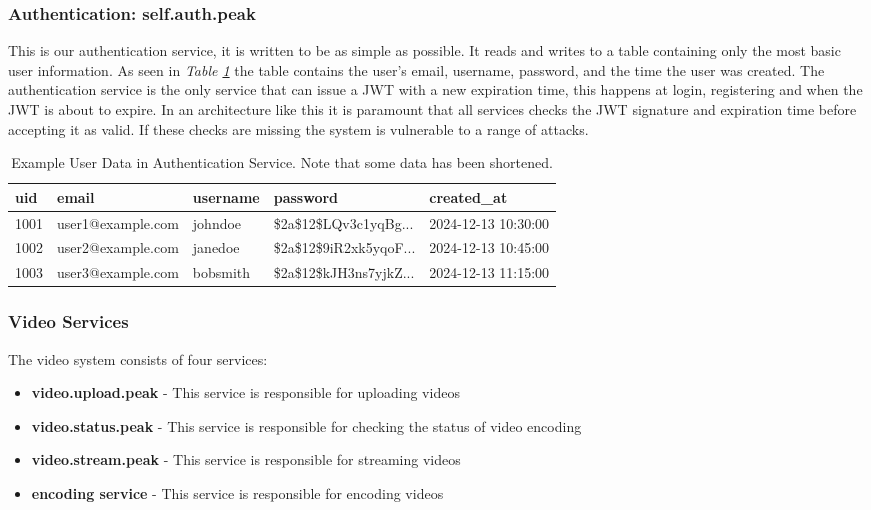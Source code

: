 \documentclass[12pt]{article}
\begin{document}
\subsubsection{Authentication: self.auth.peak}
This is our authentication service, it is written to be as simple as possible.
It reads and writes to a table containing only the most basic user information.
As seen in \textit{Table \ref{tab:user-data}} the table contains the user's email, 
username, password, and the time the user was created. The authentication service
is the only service that can issue a JWT with a new expiration time, this
happens at login, registering and when the JWT is about to expire.
In an architecture like this it is paramount that all services checks
the JWT signature and expiration time before accepting it as valid.
If these checks are missing the system is vulnerable to a range of attacks.

\begin{table}[h]
    \centering
    \caption{Example User Data in Authentication Service. Note that some data has been shortened.}
    \begin{tabular}{|l|l|l|p{4.5cm}|l|}
        \hline
        \textbf{uid} & \textbf{email} & \textbf{username} & \textbf{password} & \textbf{created\_at} \\
        \hline
        1001 & user1@example.com & johndoe & \$2a\$12\$LQv3c1yqBg... & 2024-12-13 10:30:00 \\
        \hline
        1002 & user2@example.com & janedoe & \$2a\$12\$9iR2xk5yqoF... & 2024-12-13 10:45:00 \\
        \hline
        1003 & user3@example.com & bobsmith & \$2a\$12\$kJH3ns7yjkZ... & 2024-12-13 11:15:00 \\
        \hline
    \end{tabular}
    \label{tab:user-data}
\end{table}

\newpage

\subsubsection{Video Services}
The video system consists of four services:
\begin{itemize}
    \item \textbf{video.upload.peak} - This service is responsible for uploading videos
    \item \textbf{video.status.peak} - This service is responsible for checking the status of video encoding
    \item \textbf{video.stream.peak} - This service is responsible for streaming videos
    \item \textbf{encoding service} - This service is responsible for encoding videos
\end{itemize}
\end{document}
